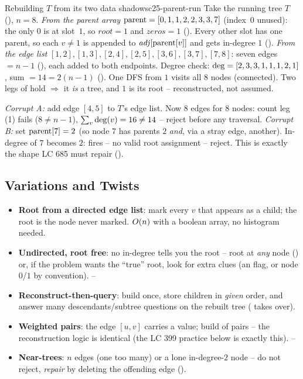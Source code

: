 \begin{example}{Rebuilding $T$ from its two data shadows}{c25-parent-run}
Take the running tree $T$ (), $n=8$.
\emph{From the parent array} $\operatorname{parent}=[0,1,1,2,2,3,3,7]$ (index~$0$ unused): the only $0$ is at
slot~$1$, so $\mathit{root}=1$ and $\mathit{zeros}=1$ (\checkmark). Every other slot has one
parent, so each $v\ne1$ is appended to $\mathit{adj}[\operatorname{parent}[v]]$ and gets in-degree $1$
(\checkmark). \emph{From the edge list} $[1,2],[1,3],[2,4],[2,5],[3,6],[3,7],[7,8]$: seven edges
$=n-1$ (\checkmark), each added to both endpoints. Degree check:
$\operatorname{deg}=[2,3,3,1,1,1,2,1]$, sum $=14=2(n-1)$ (\checkmark). One DFS from $1$ visits all $8$ nodes
(connected). Two legs of  hold $\Rightarrow$ it \emph{is} a tree, and $1$ is its
root -- reconstructed, not assumed.
\end{example}
\begin{tracebox}
\emph{Corrupt A:} add edge $[4,5]$ to $T$'s edge list. Now $8$ edges for $8$ nodes: count leg (1)
fails ($8\ne n-1$), $\sum_v\operatorname{deg}(v)=16\ne14$ -- reject before any traversal.
\emph{Corrupt B:} set $\operatorname{parent}[7]=2$ (so node $7$ has parents $2$ \emph{and}, via a stray edge,
another). In-degree of $7$ becomes $2$:  fires -- no valid root assignment --
reject. This is exactly the shape LC 685 must repair ().
\end{tracebox}

\subsection{Variations and Twists}

\begin{itemize}[nosep]
  \item \textbf{Root from a directed edge list}: mark every $v$ that appears as a child; the root
        is the node never marked. $O(n)$ with a boolean array, no histogram needed. \hfill{}
  \item \textbf{Undirected, root free}: no in-degree tells you the root -- root at \emph{any} node
        () or, if the problem wants the ``true'' root, look for extra clues
        (an  flag, or node $0$/$1$ by convention). \hfill{}--
  \item \textbf{Reconstruct-then-query}: build once, store children in \emph{given} order, and
        answer many descendants/subtree questions on the rebuilt tree ( takes over). \hfill{}
  \item \textbf{Weighted pairs}: the edge $[u,v]$ carries a value; build  of
         pairs -- the reconstruction logic is identical (the LC 399 practice below
        is exactly this). \hfill{}--
  \item \textbf{Near-trees}: $n$ edges (one too many) or a lone in-degree-$2$ node -- do not reject,
        \emph{repair} by deleting the offending edge (). \hfill{}
\end{itemize}


